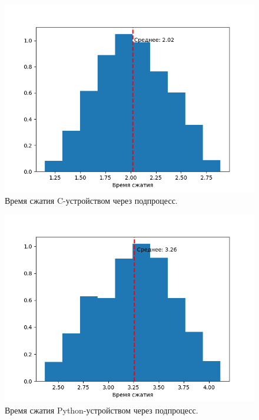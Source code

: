 \begin{figure}[!htbp]
    \centering
    \begin{adjustbox}{max totalsize={0.8\textwidth}{\textheight}}
        \includegraphics{images/hist-exec-c-dev.png}
    \end{adjustbox}
    \caption{Время сжатия C-устройством через подпроцесс.}\label{fig:hist-exec-c-dev}
\end{figure}


\begin{figure}[!htbp]
    \centering
    \begin{adjustbox}{max totalsize={0.8\textwidth}{\textheight}}
        \includegraphics{images/hist-exec-py-dev.png}
    \end{adjustbox}
    \caption{Время сжатия Python-устройством через подпроцесс.}\label{fig:hist-exec-py-dev}
\end{figure}

